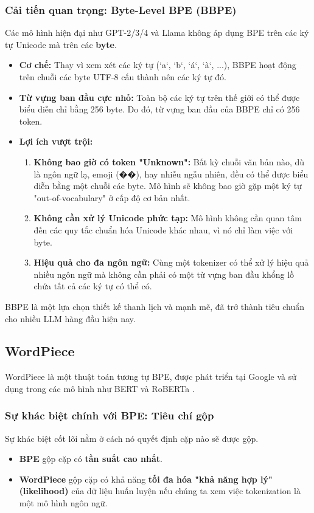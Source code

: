 \subsubsection{Cải tiến quan trọng: Byte-Level BPE (BBPE)}
Các mô hình hiện đại như GPT-2/3/4 và Llama không áp dụng BPE trên các ký tự Unicode mà trên các \textbf{byte}.
\begin{itemize}
    \item \textbf{Cơ chế:} Thay vì xem xét các ký tự (`a`, `b`, `á`, `à`, ...), BBPE hoạt động trên chuỗi các byte UTF-8 cấu thành nên các ký tự đó.
    \item \textbf{Từ vựng ban đầu cực nhỏ:} Toàn bộ các ký tự trên thế giới có thể được biểu diễn chỉ bằng 256 byte. Do đó, từ vựng ban đầu của BBPE chỉ có 256 token.
    \item \textbf{Lợi ích vượt trội:}
        \begin{enumerate}
            \item \textbf{Không bao giờ có token "Unknown":} Bất kỳ chuỗi văn bản nào, dù là ngôn ngữ lạ, emoji (��), hay nhiễu ngẫu nhiên, đều có thể được biểu diễn bằng một chuỗi các byte. Mô hình sẽ không bao giờ gặp một ký tự "out-of-vocabulary" ở cấp độ cơ bản nhất.
            \item \textbf{Không cần xử lý Unicode phức tạp:} Mô hình không cần quan tâm đến các quy tắc chuẩn hóa Unicode khác nhau, vì nó chỉ làm việc với byte.
            \item \textbf{Hiệu quả cho đa ngôn ngữ:} Cùng một tokenizer có thể xử lý hiệu quả nhiều ngôn ngữ mà không cần phải có một từ vựng ban đầu khổng lồ chứa tất cả các ký tự có thể có.
        \end{enumerate}
\end{itemize}
BBPE là một lựa chọn thiết kế thanh lịch và mạnh mẽ, đã trở thành tiêu chuẩn cho nhiều LLM hàng đầu hiện nay.
\subsection{WordPiece}
\label{ssec:wordpiece}

WordPiece là một thuật toán tương tự BPE, được phát triển tại Google và sử dụng trong các mô hình như BERT và RoBERTa \cite{wu2016google}.

\subsubsection{Sự khác biệt chính với BPE: Tiêu chí gộp}
Sự khác biệt cốt lõi nằm ở cách nó quyết định cặp nào sẽ được gộp.
\begin{itemize}
    \item \textbf{BPE} gộp cặp có \textbf{tần suất cao nhất}.
    \item \textbf{WordPiece} gộp cặp có khả năng \textbf{tối đa hóa "khả năng hợp lý" (likelihood)} của dữ liệu huấn luyện nếu chúng ta xem việc tokenization là một mô hình ngôn ngữ.
\end{itemize}

